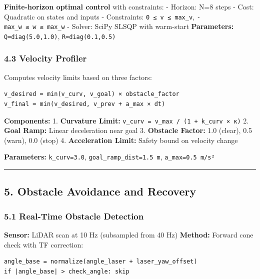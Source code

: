 \textbf{Finite-horizon optimal control} with constraints: - Horizon: N=8
steps - Cost: Quadratic on states and inputs - Constraints:
\texttt{0\ ≤\ v\ ≤\ max\_v}, \texttt{-max\_w\ ≤\ w\ ≤\ max\_w} - Solver:
SciPy SLSQP with warm-start \textbf{Parameters:}
\texttt{Q=diag(5.0,1.0)}, \texttt{R=diag(0.1,0.5)}

\hypertarget{velocity-profiler}{%
\subsubsection{4.3 Velocity Profiler}\label{velocity-profiler}}

Computes velocity limits based on three factors:

\begin{verbatim}
v_desired = min(v_curv, v_goal) × obstacle_factor
v_final = min(v_desired, v_prev + a_max × dt)
\end{verbatim}

\textbf{Components:} 1. \textbf{Curvature Limit:}
\texttt{v\_curv\ =\ v\_max\ /\ (1\ +\ k\_curv\ ×\ \textbar{}κ\textbar{})}
2. \textbf{Goal Ramp:} Linear deceleration near goal 3. \textbf{Obstacle
Factor:} 1.0 (clear), 0.5 (warn), 0.0 (stop) 4. \textbf{Acceleration
Limit:} Safety bound on velocity change

\textbf{Parameters:} \texttt{k\_curv=3.0},
\texttt{goal\_ramp\_dist=1.5\ m}, \texttt{a\_max=0.5\ m/s²}

\begin{center}\rule{0.5\linewidth}{0.5pt}\end{center}

\hypertarget{obstacle-avoidance-and-recovery}{%
\subsection{5. Obstacle Avoidance and
Recovery}\label{obstacle-avoidance-and-recovery}}

\hypertarget{real-time-obstacle-detection}{%
\subsubsection{5.1 Real-Time Obstacle
Detection}\label{real-time-obstacle-detection}}

\textbf{Sensor:} LiDAR scan at 10 Hz (subsampled from 40 Hz)
\textbf{Method:} Forward cone check with TF correction:

\begin{verbatim}
angle_base = normalize(angle_laser + laser_yaw_offset)
if |angle_base| > check_angle: skip
\end{verbatim}

